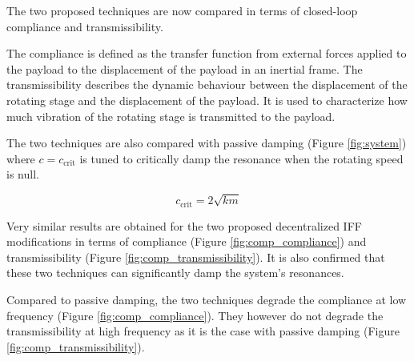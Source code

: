 \documentclass{ISMA_USD2020}
\begin{document}
\par
The two proposed techniques are now compared in terms of closed-loop compliance and transmissibility.

The compliance is defined as the transfer function from external forces applied to the payload to the displacement of the payload in an inertial frame.
The transmissibility describes the dynamic behaviour between the displacement of the rotating stage and the displacement of the payload.
It is used to characterize how much vibration of the rotating stage is transmitted to the payload.

The two techniques are also compared with passive damping (Figure \ref{fig:system}) where \(c = c_\text{crit}\) is tuned to critically damp the resonance when the rotating speed is null.

\begin{equation}
  c_\text{crit} = 2 \sqrt{k m}
\end{equation}

Very similar results are obtained for the two proposed decentralized IFF modifications in terms of compliance (Figure \ref{fig:comp_compliance}) and transmissibility (Figure \ref{fig:comp_transmissibility}).
It is also confirmed that these two techniques can significantly damp the system's resonances.

Compared to passive damping, the two techniques degrade the compliance at low frequency (Figure \ref{fig:comp_compliance}).
They however do not degrade the transmissibility at high frequency as it is the case with passive damping (Figure \ref{fig:comp_transmissibility}).
\end{document}
